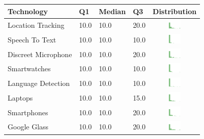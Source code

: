 \begin{table}[t]
\begin{center}
\small
\begin{tabular}{| p{2cm} | p{1cm} | p{1cm} | p{1cm} | c |}
\hline
Technology & Q1 &  Median & Q3 & Distribution  \\ 
\hline
Location Tracking & 10.0 & 10.0 & 20.0 & \includegraphics[width = 2cm, height = 0.5cm]{tex-inputs/table-images/locationtrackingrisk} \\ 
Speech To Text & 10.0 & 10.0 & 10.0 & \includegraphics[width = 2cm, height = 0.5cm]{tex-inputs/table-images/speechtotextrisk} \\ 
Discreet Microphone & 10.0 & 10.0 & 20.0 & \includegraphics[width = 2cm, height = 0.5cm]{tex-inputs/table-images/discreetmicrophonerisk} \\ 
Smartwatches & 10.0 & 10.0 & 10.0 & \includegraphics[width = 2cm, height = 0.5cm]{tex-inputs/table-images/smartwatchesrisk} \\ 
Language Detection & 10.0 & 10.0 & 10.0 & \includegraphics[width = 2cm, height = 0.5cm]{tex-inputs/table-images/languagedetectionrisk} \\ 
Laptops & 10.0 & 10.0 & 15.0 & \includegraphics[width = 2cm, height = 0.5cm]{tex-inputs/table-images/laptopsrisk} \\ 
Smartphones & 10.0 & 10.0 & 20.0 & \includegraphics[width = 2cm, height = 0.5cm]{tex-inputs/table-images/smartphonesrisk} \\ 
Google Glass & 10.0 & 10.0 & 20.0 & \includegraphics[width = 2cm, height = 0.5cm]{tex-inputs/table-images/googleglassrisk} \\ 

\end{tabular}
\end{center}
\end{table}
